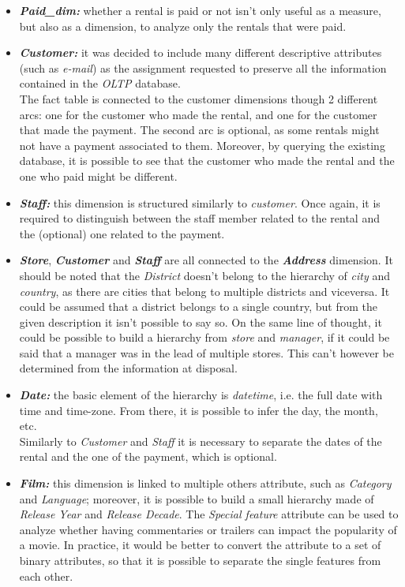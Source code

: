 \documentclass[
10pt,
a4paper,
oneside,
headinclude,
footinclude]{article}
\begin{document}
\begin{itemize}
    \item \textbf{\textit{Paid\_dim:}} whether a rental is paid or not isn't only useful as a measure, but also as a dimension, to analyze only the rentals that were paid.
    \item \textbf{\textit{Customer:}} it was decided to include many different descriptive attributes (such as \textit{e-mail}) as the assignment requested to preserve all the information contained in the \textit{OLTP} database.\\
        The fact table is connected to the customer dimensions though 2 different arcs: one for the customer who made the rental, and one for the customer that made the payment. The second arc is optional, as some rentals might not have a payment associated to them. Moreover, by querying the existing database, it is possible to see that the customer who made the rental and the one who paid might be different.
    \item \textbf{\textit{Staff:}} this dimension is structured similarly to \textit{customer}. Once again, it is required to distinguish between the staff member related to the rental and the (optional) one related to the payment.
    \item \textbf{\textit{Store}}, \textbf{\textit{Customer}} and \textbf{\textit{Staff}} are all connected to the \textbf{\textit{Address}} dimension.
        It should be noted that the \textit{District} doesn't belong to the hierarchy of \textit{city} and \textit{country}, as there are cities that belong to multiple districts and viceversa. It could be assumed that a district belongs to a single country, but from the given description it isn't possible to say so.
        On the same line of thought, it could be possible to build a hierarchy from \textit{store} and \textit{manager}, if it could be said that a manager was in the lead of multiple stores. This can't however be determined from the information at disposal.
     \item \textbf{\textit{Date:}} the basic element of the hierarchy is \textit{datetime}, i.e. the full date with time and time-zone. From there, it is possible to infer the day, the month, etc.\\
         Similarly to \textit{Customer} and \textit{Staff} it is necessary to separate the dates of the rental and the one of the payment, which is optional.
     \item \textbf{\textit{Film:}} this dimension is linked to multiple others attribute, such as \textit{Category} and \textit{Language}; moreover, it is possible to build a small hierarchy made of \textit{Release Year} and \textit{Release Decade}. The \textit{Special feature} attribute can be used to analyze whether having commentaries or trailers can impact the popularity of a movie. In practice, it would be better to convert the attribute to a set of binary attributes, so that it is possible to separate the single features from each other. \\

\end{itemize}
\end{document}
